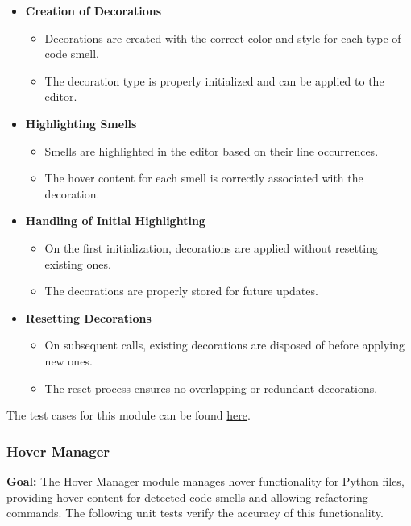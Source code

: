 \documentclass[12pt, titlepage]{article}
\begin{document}
\begin{itemize}
    \item \textbf{Creation of Decorations}
    \begin{itemize}
        \item Decorations are created with the correct color and style for each type of code smell.
        \item The decoration type is properly initialized and can be applied to the editor.
    \end{itemize}

    \item \textbf{Highlighting Smells}
    \begin{itemize}
        \item Smells are highlighted in the editor based on their line occurrences.
        \item The hover content for each smell is correctly associated with the decoration.
    \end{itemize}

    \item \textbf{Handling of Initial Highlighting}
    \begin{itemize}
        \item On the first initialization, decorations are applied without resetting existing ones.
        \item The decorations are properly stored for future updates.
    \end{itemize}

    \item \textbf{Resetting Decorations}
    \begin{itemize}
        \item On subsequent calls, existing decorations are disposed of before applying new ones.
        \item The reset process ensures no overlapping or redundant decorations.
    \end{itemize}
\end{itemize}

\noindent The test cases for this module can be found \href{https://github.com/ssm-lab/capstone--sco-vs-code-plugin/blob/plugin-multi-file/test/ui/fileHighlighter.test.ts}{here}.

\subsubsection{Hover Manager}

\textbf{Goal:} The Hover Manager module manages hover functionality for Python files, providing hover content for detected code smells and allowing refactoring commands. The following unit tests verify the accuracy of this functionality.\\
\end{document}
